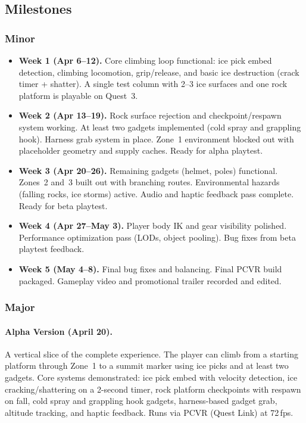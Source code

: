 \documentclass[12pt]{article}
\begin{document}
\subsection{Milestones}

\subsubsection{Minor}

\begin{itemize}[leftmargin=2em]
    \item \textbf{Week 1 (Apr 6--12).} Core climbing loop functional: ice pick embed detection, climbing locomotion, grip/release, and basic ice destruction (crack timer + shatter). A single test column with 2--3 ice surfaces and one rock platform is playable on Quest~3.

    \item \textbf{Week 2 (Apr 13--19).} Rock surface rejection and checkpoint/respawn system working. At least two gadgets implemented (cold spray and grappling hook). Harness grab system in place. Zone~1 environment blocked out with placeholder geometry and supply caches. Ready for alpha playtest.

    \item \textbf{Week 3 (Apr 20--26).} Remaining gadgets (helmet, poles) functional. Zones~2 and~3 built out with branching routes. Environmental hazards (falling rocks, ice storms) active. Audio and haptic feedback pass complete. Ready for beta playtest.

    \item \textbf{Week 4 (Apr 27--May 3).} Player body IK and gear visibility polished. Performance optimization pass (LODs, object pooling). Bug fixes from beta playtest feedback.

    \item \textbf{Week 5 (May 4--8).} Final bug fixes and balancing. Final PCVR build packaged. Gameplay video and promotional trailer recorded and edited.
\end{itemize}

\subsubsection{Major}

\paragraph{Alpha Version (April 20).}
A vertical slice of the complete experience. The player can climb from a starting platform through Zone~1 to a summit marker using ice picks and at least two gadgets. Core systems demonstrated: ice pick embed with velocity detection, ice cracking/shattering on a 2-second timer, rock platform checkpoints with respawn on fall, cold spray and grappling hook gadgets, harness-based gadget grab, altitude tracking, and haptic feedback. Runs via PCVR (Quest Link) at 72\,fps.
\end{document}

